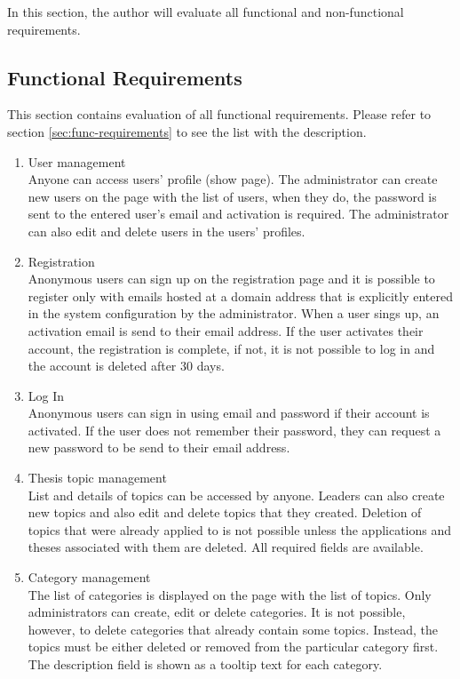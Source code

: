 In this section, the author will evaluate all functional and non-functional requirements.

\subsection{Functional Requirements}
\label{sec:eval-func-requirements}

This section contains evaluation of all functional requirements. Please refer to section \ref{sec:func-requirements} to see the list with the description.

\begin{enumerate}
    \item User management\\
    Anyone can access users' profile (show page). The administrator can create new users on the page with the list of users, when they do, the password is sent to the entered user's email and activation is required. The administrator can also edit and delete users in the users' profiles.

    \item Registration\\
    Anonymous users can sign up on the registration page and it is possible to register only with emails hosted at a domain address that is explicitly entered in the system configuration by the administrator. When a user sings up, an activation email is send to their email address. If the user activates their account, the registration is complete, if not, it is not possible to log in and the account is deleted after 30 days.

    \item Log In\\
    Anonymous users can sign in using email and password if their account is activated. If the user does not remember their password, they can request a new password to be send to their email address.

    \item Thesis topic management\\
    List and details of topics can be accessed by anyone. Leaders can also create new topics and also edit and delete topics that they created. Deletion of topics that were already applied to is not possible unless the applications and theses associated with them are deleted. All required fields are available.

    \item Category management\\
    The list of categories is displayed on the page with the list of topics. Only administrators can create, edit or delete categories. It is not possible, however, to delete categories that already contain some topics. Instead, the topics must be either deleted or removed from the particular category first. The description field is shown as a tooltip text for each category. 


\end{enumerate}
